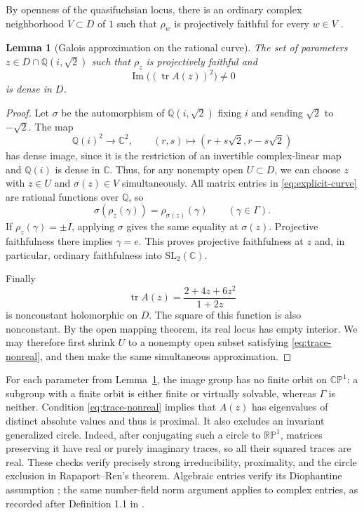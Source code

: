 \documentclass[11pt,letterpaper]{amsart}
\newtheorem{lemma}[theorem]{Lemma}
\theoremstyle{definition}
\theoremstyle{remark}
\numberwithin{equation}{section}
\begin{document}
By openness of the quasifuchsian locus, there is an ordinary complex
neighborhood $V\subset D$ of $1$ such that $\rho_w$ is projectively
faithful for every $w\in V$ \cite[Section 4.3]{GoldmanComplex}.

\begin{lemma}[Galois approximation on the rational curve]\label{lem:curve-galois}
The set of parameters $z\in D\cap\mathbb Q(i,\sqrt2)$ such that
$\rho_z$ is projectively faithful and
\begin{equation}\label{eq:trace-nonreal}
 \operatorname{Im}\big((\operatorname{tr}A(z))^2\big)\ne0
\end{equation}
is dense in $D$.
\end{lemma}
\begin{proof}
Let $\sigma$ be the automorphism of $\mathbb Q(i,\sqrt2)$ fixing
$i$ and sending $\sqrt2$ to $-\sqrt2$. The map
\[
 \mathbb Q(i)^2\longrightarrow\mathbb C^2,\qquad
 (r,s)\longmapsto(r+s\sqrt2,r-s\sqrt2)
\]
has dense image, since it is the restriction of an invertible
complex-linear map and $\mathbb Q(i)$ is dense in $\mathbb C$.
Thus, for any nonempty open $U\subset D$, we can choose $z$ with
$z\in U$ and $\sigma(z)\in V$ simultaneously.
All matrix entries in \eqref{eq:explicit-curve} are rational functions
over $\mathbb Q$, so
\[
 \sigma(\rho_z(\gamma))=\rho_{\sigma(z)}(\gamma)
 \qquad(\gamma\in\Gamma).
\]
If $\rho_z(\gamma)=\pm I$, applying $\sigma$ gives the same equality
at $\sigma(z)$. Projective faithfulness there implies $\gamma=e$.
This proves projective faithfulness at $z$ and, in particular, ordinary
faithfulness into $\mathrm{SL}_2(\mathbb C)$.

Finally
\[
 \operatorname{tr}A(z)=\frac{2+4z+6z^2}{1+2z}
\]
is nonconstant holomorphic on $D$. The square of this function is
also nonconstant. By the open mapping theorem, its real locus has
empty interior. We may therefore first shrink $U$ to a nonempty
open subset satisfying \eqref{eq:trace-nonreal}, and then make the
same simultaneous approximation.
\end{proof}

For each parameter from Lemma~\ref{lem:curve-galois}, the image group
has no finite orbit on $\mathbb{CP}^1$: a subgroup with a finite orbit
is either finite or virtually solvable, whereas $\Gamma$ is neither.
Condition \eqref{eq:trace-nonreal} implies that $A(z)$ has eigenvalues
of distinct absolute values and thus is proximal. It also excludes an
invariant generalized circle. Indeed, after conjugating such a circle
to $\mathbb{RP}^1$, matrices preserving it have real or purely imaginary
traces, so all their squared traces are real. These checks verify
precisely strong irreducibility, proximality, and the circle exclusion
in Rapaport--Ren's theorem. Algebraic entries verify its Diophantine
assumption \cite[Lemma 6.1]{HS}; the same number-field norm argument
applies to complex entries, as recorded after Definition 1.1 in \cite{RR}.
\end{document}
